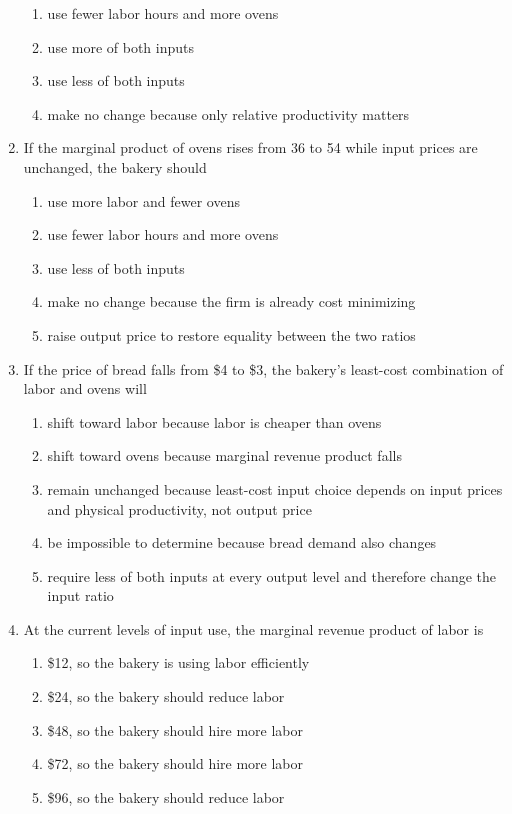 \documentclass[10pt]{article}
\newenvironment{choiceslist}
  {\begin{enumerate}[label=(\Alph*), leftmargin=1.6em, itemsep=0.12em, topsep=0.18em, parsep=0pt]}
  {\end{enumerate}}
\begin{document}
\begin{multicols*}{2}
\begin{enumerate}[resume*=apq, leftmargin=*, itemsep=0.85em, topsep=0.2em, parsep=0pt]
\begin{choiceslist}
\item use fewer labor hours and more ovens
\item use more of both inputs
\item use less of both inputs
\item make no change because only relative productivity matters
\end{choiceslist}
\item If the marginal product of ovens rises from 36 to 54 while input prices are unchanged, the bakery should
\begin{choiceslist}
\item use more labor and fewer ovens
\item use fewer labor hours and more ovens
\item use less of both inputs
\item make no change because the firm is already cost minimizing
\item raise output price to restore equality between the two ratios
\end{choiceslist}
\item If the price of bread falls from \$4 to \$3, the bakery's least-cost combination of labor and ovens will
\begin{choiceslist}
\item shift toward labor because labor is cheaper than ovens
\item shift toward ovens because marginal revenue product falls
\item remain unchanged because least-cost input choice depends on input prices and physical productivity, not output price
\item be impossible to determine because bread demand also changes
\item require less of both inputs at every output level and therefore change the input ratio
\end{choiceslist}
\item At the current levels of input use, the marginal revenue product of labor is
\begin{choiceslist}
\item \$12, so the bakery is using labor efficiently
\item \$24, so the bakery should reduce labor
\item \$48, so the bakery should hire more labor
\item \$72, so the bakery should hire more labor
\item \$96, so the bakery should reduce labor

\end{choiceslist}
\end{enumerate}
\end{multicols*}
\end{document}
